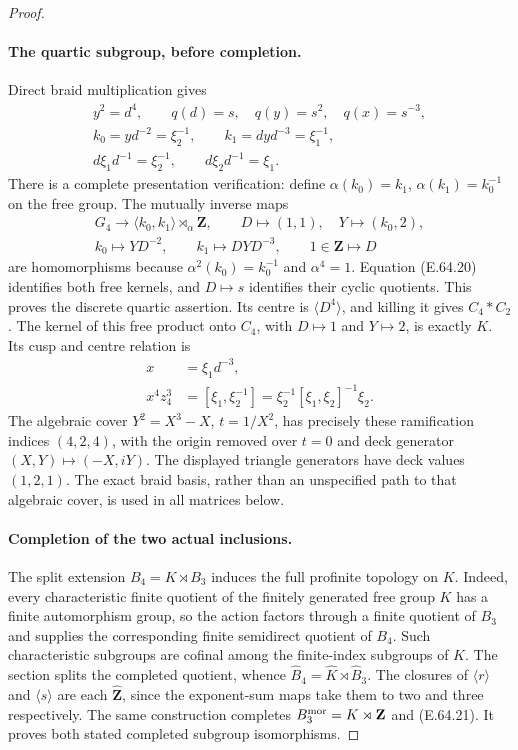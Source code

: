 \begin{proof}
\paragraph{The quartic subgroup, before completion.}
Direct braid multiplication gives
\[
 \begin{gathered}
 y^2=d^4,\qquad q(d)=s,\quad q(y)=s^2,\quad q(x)=s^{-3},\\
 k_0=yd^{-2}=\xi_2^{-1},\qquad
 k_1=dyd^{-3}=\xi_1^{-1},\\
 d\xi_1d^{-1}=\xi_2^{-1},\qquad
 d\xi_2d^{-1}=\xi_1.
 \end{gathered}
 \tag{E.64.20}
\]
There is a complete presentation verification: define
$\alpha(k_0)=k_1$, $\alpha(k_1)=k_0^{-1}$ on the free group.
The mutually inverse maps
\[
 \begin{gathered}
 G_4\longrightarrow\langle k_0,k_1\rangle\rtimes_\alpha\mathbf Z,
       \qquad D\mapsto(1,1),\quad Y\mapsto(k_0,2),\\
 k_0\mapsto YD^{-2},\qquad k_1\mapsto DYD^{-3},\qquad
                         1\in\mathbf Z\mapsto D
 \end{gathered}
 \tag{E.64.21}
\]
are homomorphisms because $\alpha^2(k_0)=k_0^{-1}$ and
$\alpha^4=1$.  Equation (E.64.20) identifies both free kernels,
and $D\mapsto s$ identifies their cyclic quotients.  This proves
the discrete quartic assertion.  Its centre is
$\langle D^4\rangle$, and killing it gives $C_4*C_2$.
The kernel of this free product onto $C_4$, with $D\mapsto1$
and $Y\mapsto2$, is exactly $K$.  Its cusp and centre relation is
\[
 \begin{split}
 x&=\xi_1d^{-3},\\
 x^4z_4^3&=[\xi_1,\xi_2^{-1}]
          =\xi_2^{-1}[\xi_1,\xi_2]^{-1}\xi_2.
 \end{split}
 \tag{E.64.22}
\]
The algebraic cover $Y^2=X^3-X$, $t=1/X^2$, has precisely
these ramification indices $(4,2,4)$, with the origin removed
over $t=0$ and deck generator $(X,Y)\mapsto(-X,iY)$.
The displayed triangle generators have deck values $(1,2,1)$.
The exact braid basis, rather than an unspecified path to that
algebraic cover, is used in all matrices below.

\paragraph{Completion of the two actual inclusions.}
The split extension $B_4=K\rtimes B_3$ induces the full
profinite topology on $K$.  Indeed, every characteristic finite
quotient of the finitely generated free group $K$ has a finite
automorphism group, so the action factors through a finite
quotient of $B_3$ and supplies the corresponding finite
semidirect quotient of $B_4$.  Such characteristic subgroups
are cofinal among the finite-index subgroups of $K$.
The section splits the completed quotient, whence
$\widehat B_4=\widehat K\rtimes\widehat B_3$.
The closures of $\langle r\rangle$ and $\langle s\rangle$ are
each $\widehat{\mathbf Z}$, since the exponent-sum maps take
them to two and three respectively.  The same construction
completes $B_3^{\rm mor}=K\rtimes\mathbf Z$ and (E.64.21).
It proves both stated completed subgroup isomorphisms.


\end{proof}
